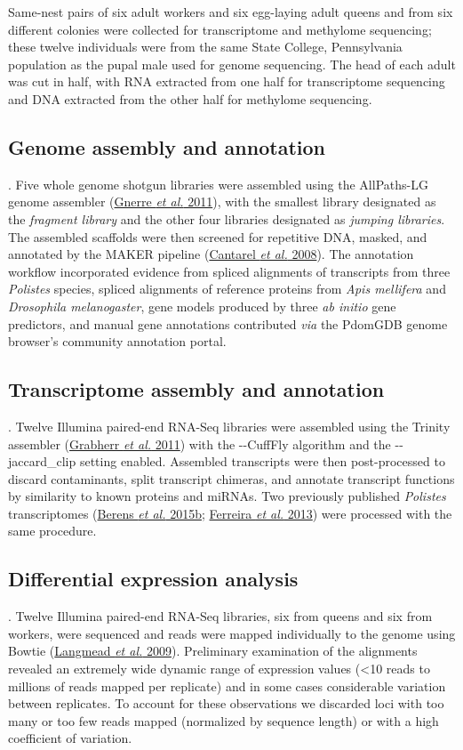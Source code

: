 Same-nest pairs of six adult workers and six egg-laying adult queens and
from six different colonies were collected for transcriptome and
methylome sequencing; these twelve individuals were from the same State
College, Pennsylvania population as the pupal male used for genome
sequencing. The head of each adult was cut in half, with RNA extracted
from one half for transcriptome sequencing and DNA extracted from the
other half for methylome sequencing.

\subsection{Genome assembly and annotation}. Five whole genome shotgun
libraries were assembled using the AllPaths-LG genome assembler
(\protect\hyperlink{ux5fENREFux5f14}{Gnerre \textit{et al.} 2011}), with
the smallest library designated as the \textit{fragment library} and the
other four libraries designated as \textit{jumping libraries}. The
assembled scaffolds were then screened for repetitive DNA, masked, and
annotated by the MAKER pipeline
(\protect\hyperlink{ux5fENREFux5f7}{Cantarel \textit{et al.} 2008}). The
annotation workflow incorporated evidence from spliced alignments of
transcripts from three \textit{Polistes} species, spliced alignments of
reference proteins from \textit{Apis mellifera} and \textit{Drosophila
melanogaster}, gene models produced by three \textit{ab initio} gene
predictors, and manual gene annotations contributed \textit{via} the
PdomGDB genome browser's community annotation portal.

\subsection{Transcriptome assembly and annotation}. Twelve Illumina
paired-end RNA-Seq libraries were assembled using the Trinity assembler
(\protect\hyperlink{ux5fENREFux5f15}{Grabherr \textit{et al.} 2011}) with
the -\/-CuffFly algorithm and the -\/-jaccard\_clip setting enabled.
Assembled transcripts were then post-processed to discard contaminants,
split transcript chimeras, and annotate transcript functions by
similarity to known proteins and miRNAs. Two previously published
\textit{Polistes} transcriptomes
(\protect\hyperlink{ux5fENREFux5f3}{Berens \textit{et al.} 2015b};
\protect\hyperlink{ux5fENREFux5f10}{Ferreira \textit{et al.} 2013}) were
processed with the same procedure.

\subsection{Differential expression analysis}. Twelve Illumina paired-end
RNA-Seq libraries, six from queens and six from workers, were sequenced
and reads were mapped individually to the genome using Bowtie
(\protect\hyperlink{ux5fENREFux5f29}{Langmead \textit{et al.} 2009}).
Preliminary examination of the alignments revealed an extremely wide
dynamic range of expression values (\textless{}10 reads to millions of
reads mapped per replicate) and in some cases considerable variation
between replicates. To account for these observations we discarded loci
with too many or too few reads mapped (normalized by sequence length) or
with a high coefficient of variation.

